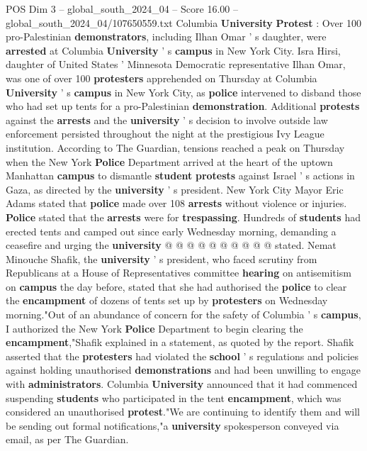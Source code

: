 \begin{textsample}{POS Dim 3 – global\_south\_2024\_04 – Score 16.00 – global\_south\_2024\_04/107650559.txt}  \label{ex:f3_pos_196}
Columbia \textbf{University} \textbf{Protest} : Over 100 pro-Palestinian \textbf{demonstrators}, including Ilhan Omar ' s daughter, were \textbf{arrested} at Columbia \textbf{University} ' s \textbf{campus} in New York City.
Isra Hirsi, daughter of United States ' Minnesota Democratic representative Ilhan Omar, was one of over 100 \textbf{protesters} apprehended on Thursday at Columbia \textbf{University} ' s \textbf{campus} in New York City, as \textbf{police} intervened to disband those who had set up tents for a pro-Palestinian \textbf{demonstration}.
Additional \textbf{protests} against the \textbf{arrests} and the \textbf{university} ' s decision to involve outside law enforcement persisted throughout the night at the prestigious Ivy League institution.
According to The Guardian, tensions reached a peak on Thursday when the New York \textbf{Police} Department arrived at the heart of the uptown Manhattan \textbf{campus} to dismantle \textbf{student} \textbf{protests} against Israel ' s actions in Gaza, as directed by the \textbf{university} ' s president.
New York City Mayor Eric Adams stated that \textbf{police} made over 108 \textbf{arrests} without violence or injuries. \textbf{Police} stated that the \textbf{arrests} were for \textbf{trespassing}.
Hundreds of \textbf{students} had erected tents and camped out since early Wednesday morning, demanding a ceasefire and urging the \textbf{university} @ @ @ @ @ @ @ @ @ @ stated.
Nemat Minouche Shafik, the \textbf{university} ' s president, who faced scrutiny from Republicans at a House of Representatives committee \textbf{hearing} on antisemitism on \textbf{campus} the day before, stated that she had authorised the \textbf{police} to clear the \textbf{encampment} of dozens of tents set up by \textbf{protesters} on Wednesday morning."Out of an abundance of concern for the safety of Columbia ' s \textbf{campus}, I authorized the New York \textbf{Police} Department to begin clearing the \textbf{encampment},"Shafik explained in a statement, as quoted by the report.
Shafik asserted that the \textbf{protesters} had violated the \textbf{school} ' s regulations and policies against holding unauthorised \textbf{demonstrations} and had been unwilling to engage with \textbf{administrators}.
Columbia \textbf{University} announced that it had commenced suspending \textbf{students} who participated in the tent \textbf{encampment}, which was considered an unauthorised \textbf{protest}."We are continuing to identify them and will be sending out formal notifications,"a \textbf{university} spokesperson conveyed via email, as per The Guardian.

\end{textsample}

